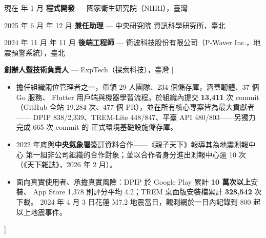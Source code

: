 \documentclass[zh]{resume}
\begin{document}
\begin{experiences}
  \experience%
    {現在 年 1 月}%
    {\textbf{程式開發} --- 國家衛生研究院（NHRI），臺灣}

  \experience%
    {2025 年 6 月 年 12 月}%
    {\textbf{兼任助理} --- 中央研究院 資訊科學研究所，臺北}

  \experience%
    {2024 年 11 月 年 11 月}%
    {\textbf{後端工程師} --- 衛波科技股份有限公司（P-Waver Inc.，地震預警系統），臺北}

    {\textbf{創辦人暨技術負責人} --- ExpTech（探索科技），臺灣}%
    [\begin{itemize}
      \item 擔任組織兩位管理者之一，帶領 29 人團隊、234 個儲存庫，涵蓋韌體、37 個 Go 服務、
        Flutter 用戶端與機器學習流程。於組織內提交 \textbf{13,411} 次 commit
        （GitHub 全站 19,284 次、477 個 PR），並在所有核心專案皆為最大貢獻者——
        DPIP 838/2,339、TREM-Lite 448/847、平臺 API 480/803——另獨力完成 665 次 commit 的
        正式環境基礎設施儲存庫。
      \item 2022 年底與\textbf{中央氣象署}簽訂資料合作——《親子天下》報導其為地震測報中心
        第一組非公司組織的合作對象；並以合作者身分進出測報中心逾 10 次（《天下雜誌》，2026 年 2 月）。
      \item 面向真實使用者、承擔真實風險：DPIP 於 Google Play 累計 \textbf{10 萬次以上}安裝、
        App Store 1,378 則評分平均 4.2；TREM 桌面版安裝檔累計 \textbf{328,542} 次下載。
        2024 年 4 月 3 日花蓮 M7.2 地震當日，觀測網於一日內記錄到 800 起以上地震事件。
    \end{itemize}]
\end{experiences}
\end{document}
